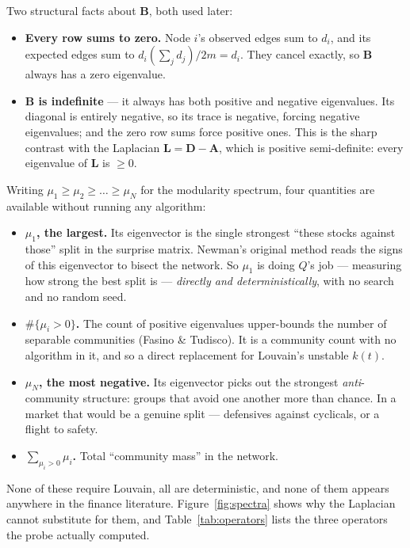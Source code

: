\documentclass[11pt,a4paper]{article}
\newcommand{\Q}{Q}
\newcommand{\Lap}{\mathbf{L}}
\newcommand{\Amat}{\mathbf{A}}
\newcommand{\Bmat}{\mathbf{B}}
\begin{document}
Two structural facts about $\Bmat$, both used later:

\begin{itemize}
\item \textbf{Every row sums to zero.} Node $i$'s observed edges sum to $d_i$,
and its expected edges sum to $d_i\left(\sum_j d_j\right)\!/2m = d_i$. They
cancel exactly, so $\Bmat$ always has a zero eigenvalue.
\item \textbf{$\Bmat$ is indefinite} --- it always has both positive and
negative eigenvalues. Its diagonal is entirely negative, so its trace is
negative, forcing negative eigenvalues; and the zero row sums force positive
ones. This is the sharp contrast with the Laplacian $\Lap=\mathbf{D}-\Amat$,
which is positive semi-definite: every eigenvalue of $\Lap$ is $\ge0$.
\end{itemize}

Writing $\mu_1\ge\mu_2\ge\dots\ge\mu_N$ for the modularity spectrum, four
quantities are available without running any algorithm:

\begin{itemize}
\item \textbf{$\mu_1$, the largest.} Its eigenvector is the single strongest
``these stocks against those'' split in the surprise matrix. Newman's original
method reads the signs of this eigenvector to bisect the network. So $\mu_1$ is
doing $\Q$'s job --- measuring how strong the best split is --- \emph{directly
and deterministically}, with no search and no random seed.
\item \textbf{$\#\{\mu_i>0\}$.} The count of positive eigenvalues upper-bounds
the number of separable communities (Fasino \& Tudisco). It is a community count
with no algorithm in it, and so a direct replacement for Louvain's unstable
$k(t)$.
\item \textbf{$\mu_N$, the most negative.} Its eigenvector picks out the
strongest \emph{anti}-community structure: groups that avoid one another more
than chance. In a market that would be a genuine split --- defensives against
cyclicals, or a flight to safety.
\item \textbf{$\sum_{\mu_i>0}\mu_i$.} Total ``community mass'' in the network.
\end{itemize}

None of these require Louvain, all are deterministic, and none of them appears
anywhere in the finance literature. Figure~\ref{fig:spectra} shows why the
Laplacian cannot substitute for them, and Table~\ref{tab:operators} lists the
three operators the probe actually computed.
\end{document}

